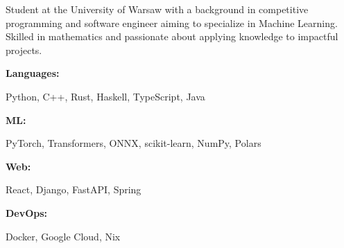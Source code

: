 \documentclass[9pt]{developercv} %
\begin{document}
\begin{minipage}[t]{0.40\textwidth}
	\vspace{-6pt}
 
	Student at the University of Warsaw with a background in competitive programming and software engineer aiming to specialize in Machine Learning. Skilled in mathematics and passionate about applying knowledge to impactful projects. \\
\end{minipage}
\hfill %
\begin{minipage}[t]{0.55\textwidth}
    \vspace{-6pt}
    
    \begin{minipage}[t]{0.15\textwidth}
        \textbf{Languages:}
    \end{minipage}
    \hfill
    \begin{minipage}[t]{0.75\textwidth}
    Python, C++, Rust, Haskell, TypeScript, Java
    \end{minipage}
    \vspace{2mm}
    
    \begin{minipage}[t]{0.15\textwidth}
        \textbf{ML:}
    \end{minipage}
    \hfill
    \begin{minipage}[t]{0.75\textwidth}
      PyTorch, Transformers, ONNX, scikit-learn, NumPy, Polars
    \end{minipage}
    \vspace{2mm}

    \begin{minipage}[t]{0.15\textwidth}
        \textbf{Web:}
    \end{minipage}
    \hfill
    \begin{minipage}[t]{0.75\textwidth}
      React, Django, FastAPI, Spring
    \end{minipage}
    \vspace{2mm}

    \begin{minipage}[t]{0.14\textwidth}
        \textbf{DevOps:}
    \end{minipage}
    \hfill
    \begin{minipage}[t]{0.76\textwidth}
     Docker, Google Cloud, Nix
    \end{minipage}
\end{minipage}
\end{document}

